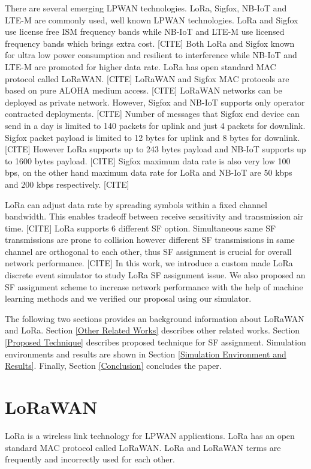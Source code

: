 \documentclass[conference]{IEEEtran}
\begin{document}
\par There are several emerging LPWAN technologies. LoRa, Sigfox, NB-IoT and LTE-M are commonly used, well known LPWAN technologies. LoRa and Sigfox use license free ISM frequency bands while NB-IoT and LTE-M use licensed frequency bands which brings extra cost. [CITE] Both LoRa and Sigfox known for ultra low power consumption and resilient to interference while NB-IoT and LTE-M are promoted for higher data rate. LoRa has open standard MAC protocol called LoRaWAN. [CITE] LoRaWAN and Sigfox MAC protocols are based on pure ALOHA medium access. [CITE] LoRaWAN networks can be deployed as private network. However, Sigfox and NB-IoT supports only operator contracted deployments. [CITE] Number of messages that Sigfox end device can send in a day is limited to 140 packets for uplink and just 4 packets for downlink. Sigfox packet payload is limited to 12 bytes for uplink and 8 bytes for downlink. [CITE] However LoRa supports up to 243 bytes payload and NB-IoT supports up to 1600 bytes payload. [CITE] Sigfox maximum data rate is also very low 100 bps, on the other hand maximum data rate for LoRa and NB-IoT are 50 kbps and 200 kbps respectively. [CITE]

\par LoRa can adjust data rate by spreading symbols within a fixed channel bandwidth. This enables tradeoff between receive sensitivity and transmission air time. [CITE] LoRa supports 6 different SF option. Simultaneous same SF transmissions are prone to collision however different SF transmissions in same channel are orthogonal to each other, thus SF assignment is crucial for overall network performance. [CITE] In this work, we introduce a custom made LoRa discrete event simulator to study LoRa SF assignment issue. We also proposed an SF assignment scheme to increase network performance with the help of machine learning methods and we verified our proposal using our simulator.

\par The following two sections provides an background information about LoRaWAN and LoRa. Section \ref{Other Related Works} describes other related works. Section \ref{Proposed Technique} describes proposed technique for SF assignment. Simulation environments and results are shown in Section \ref{Simulation Environment and Results}. Finally, Section \ref{Conclusion} concludes the paper.


\section{LoRaWAN} \label{LoRaWAN}
\par LoRa is a wireless link technology for LPWAN applications. LoRa has an open standard MAC protocol called LoRaWAN. LoRa and LoRaWAN terms are frequently and incorrectly used for each other.
\end{document}
